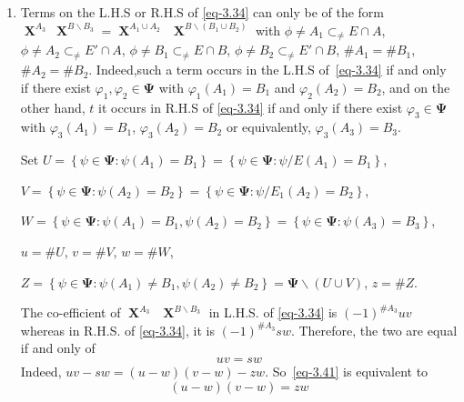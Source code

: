\documentclass[a4paper,12pt]{article}
\DeclareMathOperator{\x}{\mathrm{X}}
\theoremstyle{definition}
\theoremstyle{underlinethm}
\theoremstyle{definition}
\begin{document}
\begin{enumerate}[label=(\alph*)]

\item Terms on the L.H.S or R.H.S of \eqref{eq-3.34} can only be of the form $\boldsymbol{\x}^{A_{3}}~\boldsymbol{\x}^{B \smallsetminus B_{3}} = \boldsymbol{\x}^{A_{1} \cup A_{2}}~~\boldsymbol{\x}^{B\smallsetminus (B_{1} \cup B_{2})}$ with $\phi \neq A_{1} \subset_{\neq} E \cap A$, $\phi \neq A_{2} \subset_{\neq} E' \cap A$, $\phi \neq B_{1} \subset_{\neq} E \cap B$, $\phi \neq B_{2} \subset_{\neq} E' \cap B$, $\# A_{1} = \# B_{1}$, $\# A_{2} = \# B_{2}$. Indeed,such a term occurs in the L.H.S of~\eqref{eq-3.34} if and only if there exist $\varphi_{1}, \varphi_{2} \in \boldsymbol{\Psi}$ with  $\varphi_{1}(A_{1})= B_{1}$ and $\varphi_{2}(A_{2}) = B_{2}$, and on the other hand, $t$ it occurs in R.H.S of \eqref{eq-3.34} if and only if there exist $\varphi_{3} \in \boldsymbol{\Psi}$ with $\varphi_{3}(A_{1}) = B_{1}$, $\varphi_{3}(A_{2}) = B_{2}$ or equivalently, $\varphi_{3}(A_{3}) = B_{3}$.

Set $U = \left\{\psi \in \boldsymbol{\Psi} : \psi(A_{1}) = B_{1}\right\} = \left\{\psi \in \boldsymbol{\Psi} : \psi /E (A_{1}) = B_{1}\right\}$,

 $V= \left\{\psi \in \boldsymbol{\Psi} : \psi(A_{2}) = B_{2}\right\} = \left\{\psi \in \boldsymbol{\Psi} : \psi/E_{1} (A_{2}) =B_{2} \right\}$, 
 
 $W = \left\{\psi \in \boldsymbol{\Psi} : \psi(A_{1}) =B_{1}, \psi(A_{2}) = B_{2}\right\} = \left\{\psi \in \boldsymbol{\Psi} : \psi (A_{3}) = B_{3}\right\}$, 
 
 $u = \# U$, $v=\# V$, $w=\# W$,
 
  $Z= \left\{\psi \in \boldsymbol{\Psi} : \psi (A_{1}) \neq B_{1}, \psi(A_{2}) \neq B_{2}\right\} = \boldsymbol{\Psi} \smallsetminus (U \cup V)$, $z=\# Z$.
  
  The co-efficient of $\boldsymbol{\x}^{A_{3}}~~ \boldsymbol{\x}^{B\smallsetminus B_{3}}$ in L.H.S. of \eqref{eq-3.34} is $(-1)^{\# A_{3}} uv$ whereas in R.H.S. of \eqref{eq-3.34}, it is $(-1)^{\# A_{3}} sw$. Therefore, the two are equal if and only of 
  \begin{equation}
  uv = sw\tag{3.41}\label{eq-3.41}
  \end{equation}
  Indeed, $uv-sw =(u-w)(v-w)-zw$. So~\eqref{eq-3.41} is equivalent to
  \begin{equation}
  (u-w)(v-w)= zw\tag{3.42}\label{eq-3.42}
  \end{equation}
  

\end{enumerate}
\end{document}
